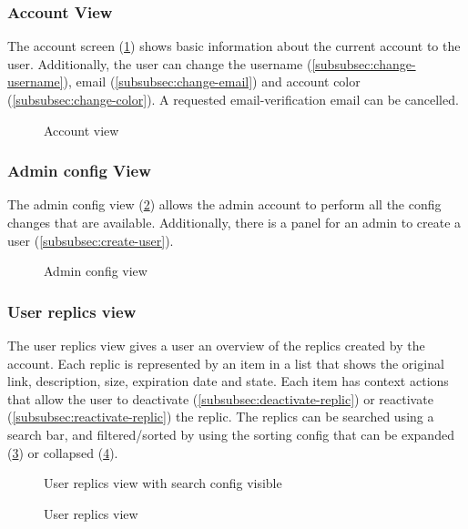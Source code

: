 \subsubsection{Account View}
The account screen (\ref{fig:web-account-view}) shows basic information about the current account to the user.
Additionally, the user can change the username (\ref{subsubsec:change-username}), email (\ref{subsubsec:change-email}) and account color (\ref{subsubsec:change-color}).
A requested email-verification email can be cancelled.
\begin{figure}
    \centering

    \caption{Account view}
    \label{fig:web-account-view}
\end{figure}

\subsubsection{Admin config View}
The admin config view (\ref{fig:web-config-view}) allows the admin account to perform all the config changes that are available.
Additionally, there is a panel for an admin to create a user (\ref{subsubsec:create-user}).
\begin{figure}
    \centering

    \caption{Admin config view}
    \label{fig:web-config-view}
\end{figure}

\subsubsection{User replics view}
The user replics view gives a user an overview of the replics created by the account.
Each replic is represented by an item in a list that shows the original link, description, size, expiration date and state.
Each item has context actions that allow the user to deactivate (\ref{subsubsec:deactivate-replic}) or reactivate (\ref{subsubsec:reactivate-replic}) the replic.
The replics can be searched using a search bar, and filtered/sorted by using the sorting config that can be expanded (\ref{fig:web-user-replics-config-view}) or collapsed (\ref{fig:web-user-replics-noconfig-view}).
\begin{figure}
    \centering

    \caption{User replics view with search config visible}
    \label{fig:web-user-replics-config-view}
\end{figure}
\begin{figure}
    \centering

    \caption{User replics view}
    \label{fig:web-user-replics-noconfig-view}
\end{figure}

